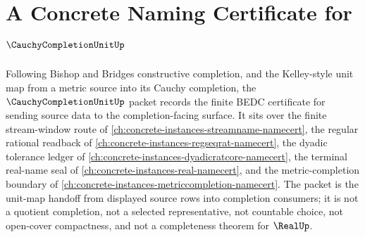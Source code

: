 \chapter{A Concrete Naming Certificate for $\CauchyCompletionUnitUp$}
\label{ch:concrete-instances-cauchycompletionunit-namecert}

Following Bishop and Bridges constructive completion, and the Kelley-style unit map from a metric source into its Cauchy completion, the $\CauchyCompletionUnitUp$ packet records the finite BEDC certificate for sending source data to the completion-facing surface. It sits over the finite stream-window route of \autoref{ch:concrete-instances-streamname-namecert}, the regular rational readback of \autoref{ch:concrete-instances-regseqrat-namecert}, the dyadic tolerance ledger of \autoref{ch:concrete-instances-dyadicratcore-namecert}, the terminal real-name seal of \autoref{ch:concrete-instances-real-namecert}, and the metric-completion boundary of \autoref{ch:concrete-instances-metriccompletion-namecert}. The packet is the unit-map handoff from displayed source rows into completion consumers; it is not a quotient completion, not a selected representative, not countable choice, not open-cover compactness, and not a completeness theorem for $\RealUp$.

